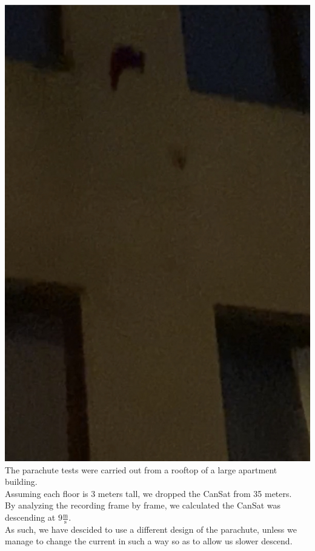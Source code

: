 \documentclass[class=report, crop=false]{standalone}
\begin{document}
\includegraphics[width=\textwidth]{ext/parachutetest.png}
\newpage
The parachute tests were carried out from a rooftop of a large apartment building. \\
Assuming each floor is $3$ meters tall, we dropped the CanSat from 35 meters. \\
By analyzing the recording frame by frame, we calculated the CanSat was descending at $9\frac{\text{m}}{\text{s}}$. \\
As such, we have descided to use a different design of the parachute, unless we manage to change the current in such a way so as to allow us slower descend.
\end{document}
